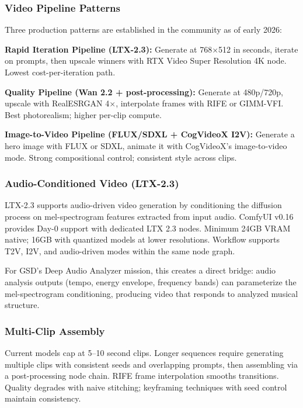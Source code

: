 \documentclass[11pt,letterpaper]{article}
\begin{document}
\subsubsection{Video Pipeline Patterns}

Three production patterns are established in the community as of early 2026:

\textbf{Rapid Iteration Pipeline (LTX-2.3):} Generate at 768$\times$512 in seconds,
iterate on prompts, then upscale winners with RTX Video Super Resolution 4K node.
Lowest cost-per-iteration path.

\textbf{Quality Pipeline (Wan 2.2 + post-processing):} Generate at 480p/720p,
upscale with RealESRGAN 4$\times$, interpolate frames with RIFE or GIMM-VFI.
Best photorealism; higher per-clip compute.

\textbf{Image-to-Video Pipeline (FLUX/SDXL + CogVideoX I2V):} Generate a hero
image with FLUX or SDXL, animate it with CogVideoX's image-to-video mode.
Strong compositional control; consistent style across clips.

\subsubsection{Audio-Conditioned Video (LTX-2.3)}

LTX-2.3 supports audio-driven video generation by conditioning the diffusion process
on mel-spectrogram features extracted from input audio. ComfyUI v0.16 provides Day-0
support with dedicated LTX 2.3 nodes. Minimum 24GB VRAM native; 16GB with quantized
models at lower resolutions. Workflow supports T2V, I2V, and audio-driven modes
within the same node graph.

For GSD's Deep Audio Analyzer mission, this creates a direct bridge: audio analysis
outputs (tempo, energy envelope, frequency bands) can parameterize the mel-spectrogram
conditioning, producing video that responds to analyzed musical structure.

\subsubsection{Multi-Clip Assembly}

Current models cap at 5--10 second clips. Longer sequences require generating
multiple clips with consistent seeds and overlapping prompts, then assembling via
a post-processing node chain. RIFE frame interpolation smooths transitions.
Quality degrades with naive stitching; keyframing techniques with seed control
maintain consistency.
\end{document}
